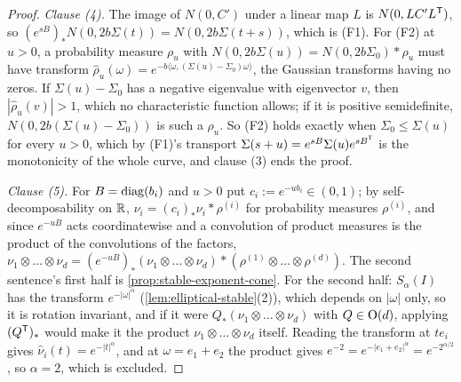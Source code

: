 \begin{proof}
\emph{Clause (4).} The image of $N(0, C')$ under a linear map $L$ is $N(0, LC'L^{\mathsf{T}})$, so
$(e^{sB})_*N(0, 2b\Sigma(t)) = N(0, 2b\Sigma(t+s))$, which is (F1). For (F2) at $u > 0$, a
probability measure $\rho_u$ with $N(0,2b\Sigma(u)) = N(0,2b\Sigma_0) * \rho_u$ must have transform
$\widehat\rho_u(\omega) = e^{-b\langle\omega,(\Sigma(u) - \Sigma_0)\omega\rangle}$, the Gaussian
transforms having no zeros. If $\Sigma(u) - \Sigma_0$ has a negative eigenvalue with eigenvector $v$,
then $|\widehat\rho_u(v)| > 1$, which no characteristic function allows; if it is positive
semidefinite, $N(0, 2b(\Sigma(u) - \Sigma_0))$ is such a $\rho_u$. So (F2) holds exactly when
$\Sigma_0 \le \Sigma(u)$ for every $u > 0$, which by (F1)'s transport $\Sigma(s+u) =
e^{sB}\Sigma(u)e^{sB^{\mathsf{T}}}$ is the monotonicity of the whole curve, and clause (3) ends the proof.

\emph{Clause (5).} For $B = \operatorname{diag}(b_i)$ and $u > 0$ put $c_i := e^{-ub_i} \in (0,1)$; by
self-decomposability on $\mathbb{R}$, $\nu_i = (c_i)_*\nu_i * \rho^{(i)}$ for probability measures
$\rho^{(i)}$, and since $e^{-uB}$ acts coordinatewise and a convolution of product measures is the
product of the convolutions of the factors,
$\nu_1 \otimes \dots \otimes \nu_d = (e^{-uB})_*(\nu_1 \otimes \dots \otimes \nu_d) * (\rho^{(1)} \otimes \dots \otimes \rho^{(d)})$. The second sentence's
first half is \ref{prop:stable-exponent-cone}. For the second half: $S_\alpha(I)$ has the transform
$e^{-|\omega|^\alpha}$ (\ref{lem:elliptical-stable}(2)), which depends on $|\omega|$ only, so it is
rotation invariant, and if it were $Q_*(\nu_1 \otimes \dots \otimes \nu_d)$ with $Q \in \mathrm{O}(d)$, applying
$(Q^{\mathsf{T}})_*$ would make it the product $\nu_1 \otimes \dots \otimes \nu_d$ itself. Reading the transform at
$te_i$ gives $\widehat\nu_i(t) = e^{-|t|^\alpha}$, and at $\omega = e_1 + e_2$ the product gives
$e^{-2} = e^{-|e_1 + e_2|^\alpha} = e^{-2^{\alpha/2}}$, so $\alpha = 2$, which is excluded.
\end{proof}

